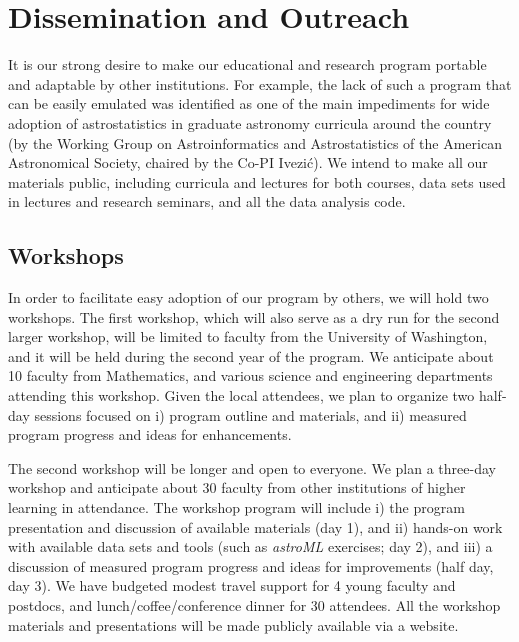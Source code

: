 \section{Dissemination and Outreach}
\label{sec:outreach}


It is our strong desire to make our educational and research
program portable and adaptable by other institutions. For example, 
the lack of such a program that can be easily emulated was identified 
as one of the main impediments for wide adoption of astrostatistics
in graduate astronomy curricula around the country (by the Working 
Group on Astroinformatics and Astrostatistics of the American Astronomical
Society, chaired by the Co-PI Ivezi\'{c}).  We intend to make all our
materials public, including curricula and lectures for both courses,
data sets used in lectures and research seminars, and all the data
analysis code. 


\subsection{Workshops} 
\label{sec:workshop}

In order to facilitate easy adoption of our program by others, we will
hold two workshops. The first workshop, which will also serve as a dry
run for the second larger workshop, will be limited to faculty from
the University of Washington, and it will be held during the second
year of the program. We anticipate about 10 faculty from Mathematics,
and various
science and engineering departments attending this workshop. Given the
local attendees, we plan to organize two half-day sessions focused on
i) program outline and materials, and ii) measured program progress
and ideas for enhancements.

The second workshop will be longer and open to everyone. We plan a 
three-day workshop and anticipate about 30 faculty from other
institutions of higher learning in attendance. The workshop program
will include i) the program presentation and discussion of available 
materials (day 1), and ii) hands-on work with available data sets and
tools (such as {\it astroML} exercises; day 2), and iii) a discussion
of measured program progress and ideas for improvements (half day, day
3). We have budgeted modest travel support for 4 young faculty and
postdocs, and lunch/coffee/conference dinner for 30 attendees. 
All the workshop materials and presentations will be made publicly
available via a website. 
